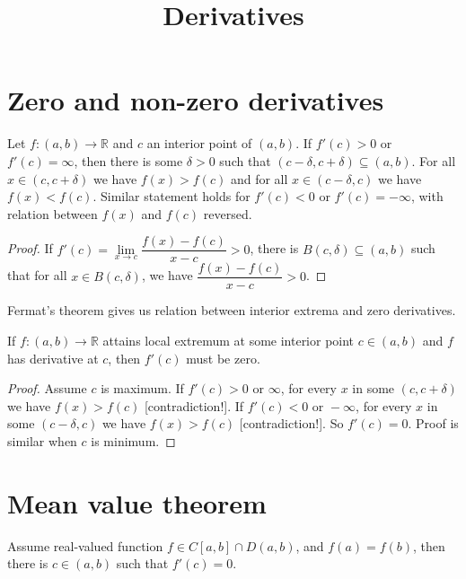 \documentclass{article}
\title{Derivatives}
\newcommand{\R}{\mathbb R}
\begin{document}
\maketitle
\tableofcontents
\section{Zero and non-zero derivatives}
\begin{theorem}
    Let $ f \colon (a, b) \to \R $ and $ c $ an interior point of $ (a, b) $. If $ f'(c) > 0 $ or $ f'(c) = \infty $, then there is some $ \delta > 0 $ such that $ (c - \delta, c + \delta) \subseteq (a, b) $. For all $ x \in (c, c + \delta) $ we have $ f(x) > f(c) $ and for all $ x \in (c - \delta, c) $ we have $ f(x) < f(c) $. Similar statement holds for $ f'(c) < 0 $ or $ f'(c) = -\infty $, with relation between $ f(x) $ and $ f(c) $ reversed.
\end{theorem}

\begin{proof}
    If $ f'(c) = \lim\limits_{x \to c} \dfrac{f(x) - f(c)}{x - c} > 0 $, there is $ B(c, \delta) \subseteq (a, b) $ such that for all $ x \in B(c, \delta) $, we have $ \dfrac{f(x) - f(c)}{x - c} > 0 $.
\end{proof}

Fermat's theorem gives us relation between interior extrema and zero derivatives.
\begin{theorem}
    If $ f \colon (a, b) \to \R $ attains local extremum at some interior point $ c \in (a, b) $ and $ f $ has derivative at $ c $, then $ f'(c) $ must be zero.
\end{theorem}

\begin{proof}
    Assume $ c $ is maximum. If $ f'(c) > 0 \text{ or } \infty $, for every $ x $ in some $ (c, c + \delta) $ we have $ f(x) > f(c) $ [contradiction!]. If $ f'(c) < 0 \text{ or } -\infty $, for every $ x $ in some $ (c - \delta, c) $ we have $ f(x) > f(c) $ [contradiction!]. So $ f'(c) = 0 $. Proof is similar when $ c $ is minimum.
\end{proof}

\section{Mean value theorem}
\begin{theorem}
    Assume real-valued function $ f \in C[a, b] \cap D(a, b) $, and $ f(a) = f(b) $, then there is $ c \in (a, b) $ such that $ f'(c) = 0 $.
\end{theorem}
\end{document}
